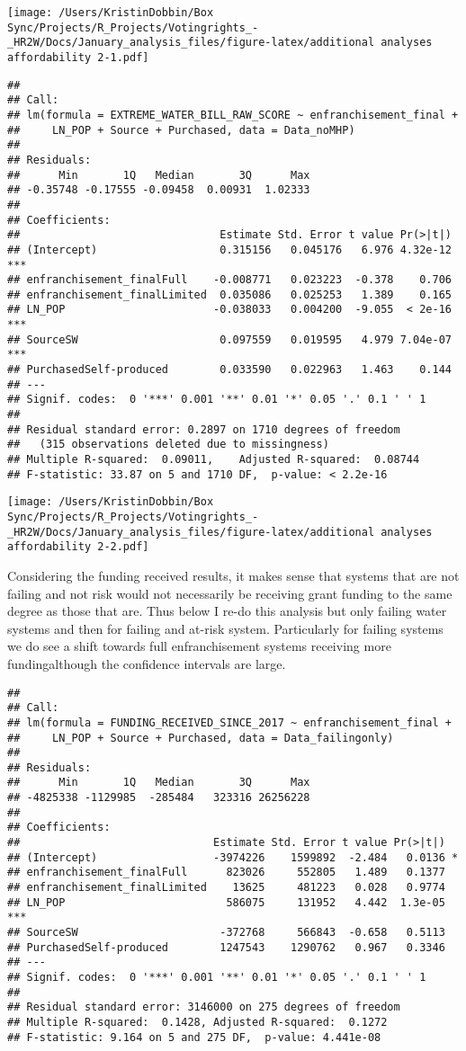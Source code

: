 \documentclass[
]{article}
\begin{document}
\texttt{[image: /Users/KristinDobbin/Box Sync/Projects/R\_Projects/Votingrights\_-\_HR2W/Docs/January\_analysis\_files/figure-latex/additional analyses affordability 2-1.pdf]}

\begin{verbatim}
## 
## Call:
## lm(formula = EXTREME_WATER_BILL_RAW_SCORE ~ enfranchisement_final + 
##     LN_POP + Source + Purchased, data = Data_noMHP)
## 
## Residuals:
##      Min       1Q   Median       3Q      Max 
## -0.35748 -0.17555 -0.09458  0.00931  1.02333 
## 
## Coefficients:
##                               Estimate Std. Error t value Pr(>|t|)    
## (Intercept)                   0.315156   0.045176   6.976 4.32e-12 ***
## enfranchisement_finalFull    -0.008771   0.023223  -0.378    0.706    
## enfranchisement_finalLimited  0.035086   0.025253   1.389    0.165    
## LN_POP                       -0.038033   0.004200  -9.055  < 2e-16 ***
## SourceSW                      0.097559   0.019595   4.979 7.04e-07 ***
## PurchasedSelf-produced        0.033590   0.022963   1.463    0.144    
## ---
## Signif. codes:  0 '***' 0.001 '**' 0.01 '*' 0.05 '.' 0.1 ' ' 1
## 
## Residual standard error: 0.2897 on 1710 degrees of freedom
##   (315 observations deleted due to missingness)
## Multiple R-squared:  0.09011,    Adjusted R-squared:  0.08744 
## F-statistic: 33.87 on 5 and 1710 DF,  p-value: < 2.2e-16
\end{verbatim}

\texttt{[image: /Users/KristinDobbin/Box Sync/Projects/R\_Projects/Votingrights\_-\_HR2W/Docs/January\_analysis\_files/figure-latex/additional analyses affordability 2-2.pdf]}

Considering the funding received results, it makes sense that systems
that are not failing and not risk would not necessarily be receiving
grant funding to the same degree as those that are. Thus below I re-do
this analysis but only failing water systems and then for failing and
at-risk system. Particularly for failing systems we do see a shift
towards full enfranchisement systems receiving more fundingalthough the
confidence intervals are large.

\begin{verbatim}
## 
## Call:
## lm(formula = FUNDING_RECEIVED_SINCE_2017 ~ enfranchisement_final + 
##     LN_POP + Source + Purchased, data = Data_failingonly)
## 
## Residuals:
##      Min       1Q   Median       3Q      Max 
## -4825338 -1129985  -285484   323316 26256228 
## 
## Coefficients:
##                              Estimate Std. Error t value Pr(>|t|)    
## (Intercept)                  -3974226    1599892  -2.484   0.0136 *  
## enfranchisement_finalFull      823026     552805   1.489   0.1377    
## enfranchisement_finalLimited    13625     481223   0.028   0.9774    
## LN_POP                         586075     131952   4.442  1.3e-05 ***
## SourceSW                      -372768     566843  -0.658   0.5113    
## PurchasedSelf-produced        1247543    1290762   0.967   0.3346    
## ---
## Signif. codes:  0 '***' 0.001 '**' 0.01 '*' 0.05 '.' 0.1 ' ' 1
## 
## Residual standard error: 3146000 on 275 degrees of freedom
## Multiple R-squared:  0.1428, Adjusted R-squared:  0.1272 
## F-statistic: 9.164 on 5 and 275 DF,  p-value: 4.441e-08
\end{verbatim}
\end{document}
